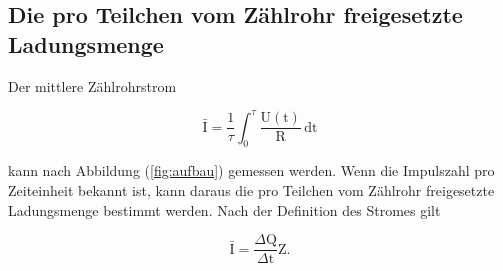 \subsection{Die pro Teilchen vom Zählrohr freigesetzte Ladungsmenge}
Der mittlere Zählrohrstrom 

\begin{equation*}
\bar{\text{I}}=\frac{1}{\tau} \int_0^\tau \frac{\text{U}(\text{t})}{\text{R}} \, \text{dt}
\end{equation*}


\noindent
kann nach Abbildung (\ref{fig:aufbau}) gemessen werden.
Wenn die Impulszahl pro Zeiteinheit bekannt ist, kann daraus die pro Teilchen vom Zählrohr freigesetzte Ladungsmenge bestimmt werden.
Nach der Definition des Stromes gilt

\begin{equation}
\bar{\text{I}}=\frac{\Delta\text{Q}}{\Delta\text{t}}\text{Z}.
\label{eqn:i}
\end{equation}